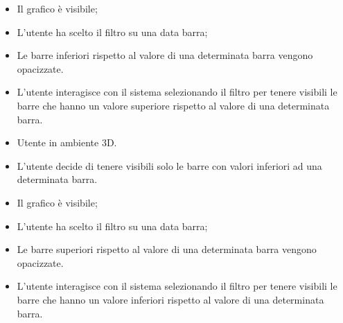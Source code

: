{ %
    \begin{itemize}
        \item Il grafico è visibile;
        \item L'utente ha scelto il filtro su una data barra;
    \end{itemize}
}
{ %
    \begin{itemize}
        \item Le barre inferiori rispetto al valore di una determinata barra vengono opacizzate.
    \end{itemize}
}
{ %
    \begin{itemize}
        \item L'utente interagisce con il sistema selezionando il filtro per tenere visibili le barre che hanno un valore superiore rispetto al valore di una determinata barra.
    \end{itemize}
}
\UCdsc
{ %
    \begin{itemize}
        \item Utente in ambiente 3D.
    \end{itemize}
}
{ %
    \begin{itemize}
        \item L'utente decide di tenere visibili solo le barre con valori inferiori ad una determinata barra.
    \end{itemize}
}
{ %
    \begin{itemize}
        \item Il grafico è visibile;
        \item L'utente ha scelto il filtro su una data barra;
    \end{itemize}
}
{ %
    \begin{itemize}
        \item Le barre superiori rispetto al valore di una determinata barra vengono opacizzate.
    \end{itemize}
}
{ %
    \begin{itemize}
        \item L'utente interagisce con il sistema selezionando il filtro per tenere visibili le barre che hanno un valore inferiori rispetto al valore di una determinata barra.
    \end{itemize}
}

